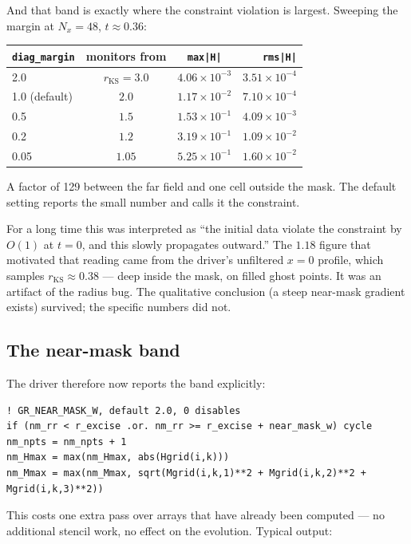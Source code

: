 And that band is exactly where the constraint violation is largest. Sweeping
the margin at $N_x = 48$, $t \approx 0.36$:

\begin{center}
\begin{tabular}{@{}lccr@{}}
\toprule
\texttt{diag\_margin} & monitors from & \texttt{max|H|} & \texttt{rms|H|} \\
\midrule
2.0 & $r_{\mathrm{KS}} = 3.0$ & $4.06\times10^{-3}$ & $3.51\times10^{-4}$ \\
1.0 (default) & $2.0$ & $1.17\times10^{-2}$ & $7.10\times10^{-4}$ \\
0.5 & $1.5$ & $1.53\times10^{-1}$ & $4.09\times10^{-3}$ \\
0.2 & $1.2$ & $3.19\times10^{-1}$ & $1.09\times10^{-2}$ \\
0.05 & $1.05$ & $5.25\times10^{-1}$ & $1.60\times10^{-2}$ \\
\bottomrule
\end{tabular}
\end{center}

A factor of 129 between the far field and one cell outside the mask. The
default setting reports the small number and calls it the constraint.

\gotcha
For a long time this was interpreted as ``the initial data violate the
constraint by $O(1)$ at $t=0$, and this slowly propagates outward.'' The
$1.18$ figure that motivated that reading came from the driver's unfiltered
$x = 0$ profile, which samples $r_{\mathrm{KS}} \approx 0.38$ --- deep inside
the mask, on filled ghost points. It was an artifact of the radius bug. The
qualitative conclusion (a steep near-mask gradient exists) survived; the
specific numbers did not.

\subsection{The near-mask band}

The driver therefore now reports the band explicitly:
\begin{lstlisting}
! GR_NEAR_MASK_W, default 2.0, 0 disables
if (nm_rr < r_excise .or. nm_rr >= r_excise + near_mask_w) cycle
nm_npts = nm_npts + 1
nm_Hmax = max(nm_Hmax, abs(Hgrid(i,k)))
nm_Mmax = max(nm_Mmax, sqrt(Mgrid(i,k,1)**2 + Mgrid(i,k,2)**2 + Mgrid(i,k,3)**2))
\end{lstlisting}

This costs one extra pass over arrays that have already been computed --- no
additional stencil work, no effect on the evolution. Typical output:


